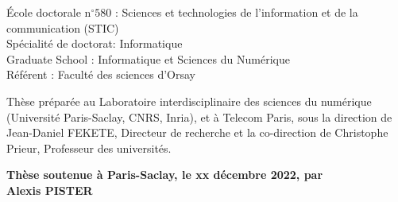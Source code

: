 \documentclass[12pt,a4paper, twoside]{book}
\begin{document}
\begin{titlepage}
        \vspace{6mm}

        \small École doctorale n$^{\circ}580$ : Sciences et technologies de l’information et de la communication (STIC)\\
        \small Spécialité de doctorat: Informatique\\
        \small Graduate School : Informatique et Sciences du Numérique\\
        \small Référent : Faculté des sciences d’Orsay \\
        \vspace{6mm}


        \footnotesize Thèse préparée au Laboratoire interdisciplinaire des sciences du numérique (Université Paris-Saclay, CNRS, Inria), et à Telecom Paris, sous la direction de Jean-Daniel FEKETE, Directeur de recherche et la co-direction de Christophe Prieur, Professeur des universités. \\

        \vspace{15mm}

        \textbf{Thèse soutenue à Paris-Saclay, le xx décembre 2022, par}\\
        \bigskip
        \Large {\color{Prune} \textbf{Alexis PISTER}} %

        \vspace{\fill} %

        \bigskip


\end{titlepage}
\end{document}
